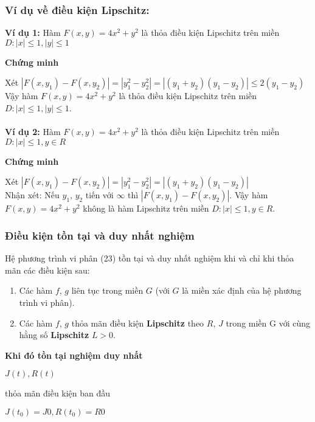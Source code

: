\subsubsection*{Ví dụ về điều kiện Lipschitz:}
\textbf{Ví dụ 1: } Hàm $F(x,y)=4x^2+y^2$ là thỏa điều kiện Lipschitz trên miền $D: |x|\leq 1, |y|\leq 1$\\
\centerline{\textbf{Chứng minh}}
Xét $|F(x,y_1)-F(x,y_2)|=|y_1^2-y_2^2|=|(y_1+y_2)(y_1-y_2)|\leq 2(y_1-y_2)$\\
Vậy hàm $F(x,y)=4x^2+y^2$ là thỏa điều kiện Lipschitz trên miền $D: |x|\leq 1, |y|\leq 1$.\\\\
\textbf{Ví dụ 2: } Hàm $F(x,y)=4x^2+y^2$ là thỏa điều kiện Lipschitz trên miền $D: |x|\leq 1, y \in R$\\
\centerline{\textbf{Chứng minh}}
Xét $|F(x,y_1)-F(x,y_2)|=|y_1^2-y_2^2|=|(y_1+y_2)(y_1-y_2)|$\\
Nhận xét: Nếu $y_1$, $y_2$ tiến với $\infty$ thì $|F(x,y_1)-F(x,y_2)|$.
Vậy hàm $F(x,y)=4x^2+y^2$ không là hàm Lipschitz trên miền $D: |x|\leq 1, y \in R$.
\subsubsection{Điều kiện tồn tại và duy nhất nghiệm}
Hệ phương trình vi phân (23) tồn tại và duy nhất nghiệm khi và chỉ khi thỏa mãn các điều kiện sau:
\begin{enumerate}
    \item Các hàm $f$, $g$ liên tục trong miền $G$ (với $G$ là miền xác định của hệ phương trình vi phân).
    \item Các hàm $f$, $g$ thỏa mãn điều kiện \textbf{Lipschitz} theo $R$, $J$ trong miền G với cùng hằng số \textbf{Lipschitz} $L>0$.
\end{enumerate}
\textbf{Khi đó tồn tại nghiệm duy nhất} \\
\centerline{$J(t), R(t)$}

thỏa mãn điều kiện ban đầu\\
\centerline{$J(t_0)=J0, R(t_0)=R0$}
